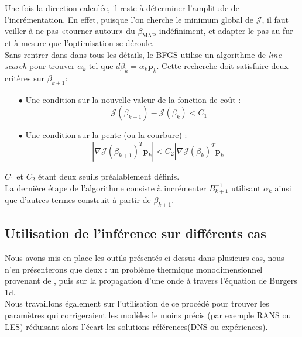 \documentclass[a4paper,12pt]{article}
\newcommand{\bepar}[1]{
	\left( #1 \right)  
}
\newcommand{\bmap}{\beta_{\text{MAP}}}
\newcommand{\J}{\mathcal{J}}
\newcommand\bk{\color{black}}
\newcommand\brick{\color{brick}}
\numberwithin{equation}{section} %
\begin{document}
\noindent Une fois la direction calculée, il reste à déterminer l'amplitude de l'incrémentation. En effet, puisque l'on cherche le minimum global de $\J$, il faut veiller à ne pas «tourner autour» du $\bmap$ indéfiniment, et adapter le pas au fur et à mesure que l'optimisation se déroule.\\ 
Sans rentrer dans dans tous les détails, le BFGS utilise un algorithme de \textit{line search} pour trouver $ \displaystyle \alpha_k$ tel que $d\beta_k = \alpha_k\mathbf{p}_k$. Cette recherche doit satisfaire deux critères sur $\beta_{k+1}$: 
\begin{itemize}
\item[$\bullet$] Une condition sur la nouvelle valeur de la fonction de coût : \begin{equation}
\J\bepar{\beta_{k+1}} - \J\bepar{\beta_k} < C_1
\end{equation} 

\item[$\bullet$] Une condition sur la pente (ou la courbure) : 
\begin{equation}
|\nabla\J \bepar{\beta_{k+1}}^T\textbf{p}_k| < C_2 |\nabla\J \bepar{\beta_k}^T\textbf{p}_k|
\end{equation}
\end{itemize} 
$C_1$ et $C_2$ étant deux seuils préalablement définis.\\
La dernière étape de l'algorithme consiste à incrémenter $B_{k+1}^{-1}$ utilisant $\alpha_k$ ainsi que d'autres termes construit à partir de $\beta_{k+1}$.\\

\pagebreak

\brick \subsection{Utilisation de l'inférence sur différents cas} \bk

\noindent Nous avons mis en place les outils présentés ci-dessus dans plusieurs cas, nous n'en présenterons que deux : un problème thermique monodimensionnel provenant de \citep{parish2016paradigm}, puis sur la propagation d'une onde à travers l'équation de Burgers 1d. \\
Nous travaillons également sur l'utilisation de ce procédé pour trouver les paramètres  qui corrigeraient les modèles le moins précis (par exemple RANS ou LES) réduisant alors l'écart les solutions références(DNS ou expériences).
\end{document}
